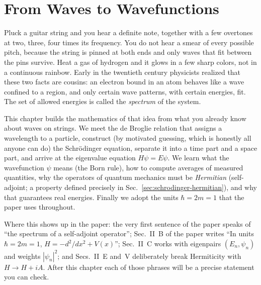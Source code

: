 \chapter{From Waves to Wavefunctions}\label{ch:schrodinger}

\begin{chapterintro}
Pluck a guitar string and you hear a definite note, together with a few overtones at two, three, four times its frequency. You do not hear a smear of every possible pitch, because the string is pinned at both ends and only waves that fit between the pins survive. Heat a gas of hydrogen and it glows in a few sharp colors, not in a continuous rainbow. Early in the twentieth century physicists realized that these two facts are cousins: an electron bound in an atom behaves like a wave confined to a region, and only certain wave patterns, with certain energies, fit. The set of allowed energies is called the \emph{spectrum} of the system.

This chapter builds the mathematics of that idea from what you already know about waves on strings. We meet the de Broglie relation that assigns a wavelength to a particle, construct (by motivated guessing, which is honestly all anyone can do) the Schr\"odinger equation, separate it into a time part and a space part, and arrive at the eigenvalue equation $H\psi=E\psi$. We learn what the wavefunction $\psi$ means (the Born rule), how to compute averages of measured quantities, why the operators of quantum mechanics must be \emph{Hermitian} (self-adjoint; a property defined precisely in Sec.~\ref{sec:schrodinger-hermitian}), and why that guarantees real energies. Finally we adopt the units $\hbar=2m=1$ that the paper uses throughout.

Where this shows up in the paper: the very first sentence of the paper speaks of ``the spectrum of a self-adjoint operator''; Sec.~II~B of the paper writes ``In units $\hbar=2m=1$, $H=-d^2/dx^2+V(x)$''; Sec.~II~C works with eigenpairs $(E_n,\psi_n)$ and weights $|\psi_n|^2$; and Secs.~II~E and~V deliberately break Hermiticity with $H\to H+iA$. After this chapter each of those phrases will be a precise statement you can check.
\end{chapterintro}

